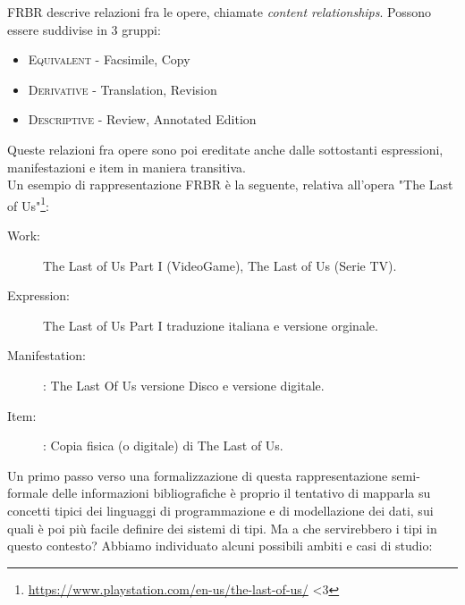 FRBR descrive relazioni fra le opere, chiamate \textit{content relationships}. Possono essere suddivise in 3 gruppi:
\begin{itemize}
	\item \textsc{Equivalent} - Facsimile, Copy
	\item \textsc{Derivative} - Translation, Revision
	\item \textsc{Descriptive} - Review, Annotated Edition
\end{itemize}
Queste relazioni fra opere sono poi ereditate anche dalle sottostanti espressioni, manifestazioni e item in maniera transitiva.
\\
Un esempio di rappresentazione FRBR è la seguente, relativa all'opera "The Last of Us"\footnote{\url{https://www.playstation.com/en-us/the-last-of-us/} <3}:
\begin{description}
	\item[Work:] The Last of Us Part I (VideoGame), The Last of Us (Serie TV).
	\item[Expression:] The Last of Us Part I traduzione italiana e versione orginale.
	\item[Manifestation:]:  The Last Of Us versione Disco e versione digitale.
	\item[Item:]: Copia fisica (o digitale) di The Last of Us.
\end{description}
\noindent
Un primo passo verso una formalizzazione di questa rappresentazione semi-formale delle informazioni bibliografiche è proprio il tentativo di mapparla su 
concetti tipici dei linguaggi di programmazione e di modellazione dei dati, sui quali è poi più facile definire dei sistemi di tipi. Ma a che servirebbero i 
tipi in questo contesto? Abbiamo individuato alcuni possibili ambiti e casi di studio:

